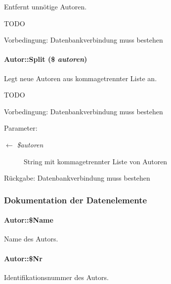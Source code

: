 Entfernt unnötige Autoren. 

TODO \begin{Desc}
\item[Vorbedingung:]Datenbankverbindung muss bestehen \end{Desc}
\hypertarget{classAutor_2ba5418b6622f414fa8a054e6c2a2db8}{
\paragraph[Split]{\setlength{\rightskip}{0pt plus 5cm}Autor::Split (\$ {\em autoren})}\hfill}
\label{classAutor_2ba5418b6622f414fa8a054e6c2a2db8}


Legt neue Autoren aus kommagetrennter Liste an. 

TODO \begin{Desc}
\item[Vorbedingung:]Datenbankverbindung muss bestehen \end{Desc}
\begin{Desc}
\item[Parameter:]
\begin{description}
\item[\mbox{$\leftarrow$} {\em \$autoren}]String mit kommagetrennter Liste von Autoren \end{description}
\end{Desc}
\begin{Desc}
\item[R\"{u}ckgabe:]Datenbankverbindung muss bestehen \end{Desc}


\subsubsection{Dokumentation der Datenelemente}
\hypertarget{classAutor_8602b5705cef83e7c16f4040f9add56d}{
\paragraph[\$Name]{\setlength{\rightskip}{0pt plus 5cm}Autor::\$Name}\hfill}
\label{classAutor_8602b5705cef83e7c16f4040f9add56d}


Name des Autors. 

\hypertarget{classAutor_23e64634d5dc31b41b7ee9c49b9ea6b9}{
\paragraph[\$Nr]{\setlength{\rightskip}{0pt plus 5cm}Autor::\$Nr}\hfill}
\label{classAutor_23e64634d5dc31b41b7ee9c49b9ea6b9}


Identifikationsnummer des Autors. 

